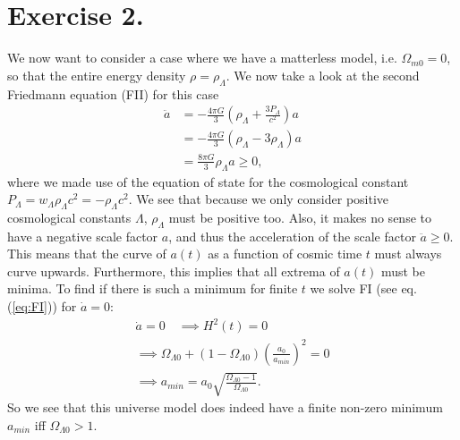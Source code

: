 \documentclass{emulateapj}
\begin{document}
	\section*{Exercise 2.}
	We now want to consider a case where we have a matterless model, i.e. $\Omega_{m 0} = 0$, so that the entire energy density $\rho = \rho_{\Lambda}$. We now take a look at the second Friedmann equation (FII) for this case
	\begin{align}
		\ddot{a} &= -\frac{4\pi G}{3}\left(\rho_{\Lambda} + \frac{3P_\Lambda}{c^2}\right)a\\
		&= -\frac{4\pi G}{3}\left(\rho_{\Lambda} -3\rho_\Lambda\right)a\\
		&= \frac{8\pi G}{3}\rho_{\Lambda}a \geq 0,
	\end{align}
	where we made use of the equation of state for the cosmological constant $P_\Lambda = w_\Lambda \rho_{\Lambda} c^2 = -\rho_{\Lambda}c^2$. We see that because we only consider positive cosmological constants $\Lambda$, $\rho_{\Lambda}$ must be positive too. Also, it makes no sense to have a negative scale factor $a$, and thus the acceleration of the scale factor $\ddot{a}\geq 0$. This means that the curve of $a(t)$ as a function of cosmic time $t$ must always curve upwards. Furthermore, this implies that all extrema of $a(t)$ must be minima. To find if there is such a minimum for finite $t$ we solve FI (see eq. (\ref{eq:FI})) for $\dot{a} = 0$:
	\begin{align}
		\dot{a} = 0\quad\implies H^2(t) = 0\\
		\implies \Omega_{\Lambda 0} + (1 - \Omega_{\Lambda 0})\left(\frac{a_0}{a_{min}}\right)^2 = 0\\
		\implies a_{min} = a_0\sqrt{\frac{\Omega_{\Lambda 0} - 1}{\Omega_{\Lambda 0}}}.
	\end{align}
	So we see that this universe model does indeed have a finite non-zero minimum $a_{min}$ iff $\Omega_{\Lambda 0} > 1$.
	
\end{document}
